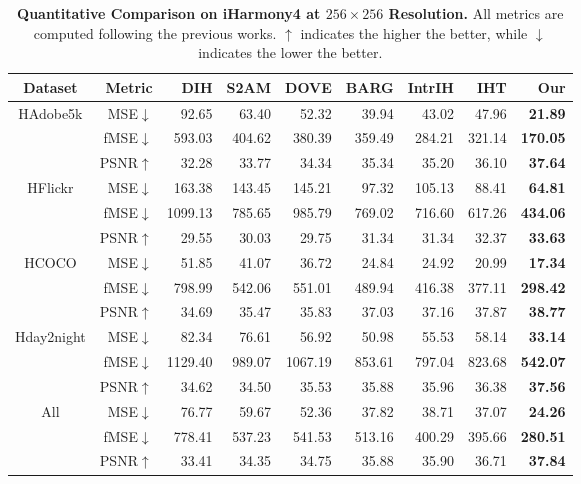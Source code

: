 \documentclass[runningheads]{llncs}
\begin{document}
\begin{table*}[t]
  \begin{center}
    \caption{\textbf{Quantitative Comparison on iHarmony4 at $256\times256$ Resolution.} All metrics are computed following the previous works. $\uparrow$ indicates the higher the better, while $\downarrow$ indicates the lower the better.}\label{tab:lowresolution}
\setlength{\tabcolsep}{3pt}
\scriptsize
\begin{tabular}{c|r|rrrrrr|r}
\toprule
Dataset & Metric & DIH\cite{DIH} & S2AM\cite{S2AM} & DOVE\cite{DoveNet} & BARG\cite{BargainNet} & IntrIH\cite{IntrinsicIH} & IHT\cite{TransformerIH} & \;\;\;\;\;\;\;\;Our \\
\midrule
\multirow{3}{*}{HAdobe5k}
& MSE$\downarrow$  &  92.65 &  63.40 &  52.32 &  39.94 &  43.02 &  47.96 &  \textbf{21.89} \\
& fMSE$\downarrow$ & 593.03 & 404.62 & 380.39 & 359.49 & 284.21 & 321.14 & \textbf{170.05} \\
& PSNR$\uparrow$   &  32.28 &  33.77 &  34.34 &  35.34 &  35.20 &  36.10 &  \textbf{37.64} \\
\midrule
\multirow{3}{*}{HFlickr}
& MSE$\downarrow$  & 163.38 & 143.45 & 145.21 &  97.32 & 105.13 &  88.41 &  \textbf{64.81} \\
& fMSE$\downarrow$ &1099.13 & 785.65 & 985.79 & 769.02 & 716.60 & 617.26 & \textbf{434.06} \\
& PSNR$\uparrow$   &  29.55 &  30.03 &  29.75 &  31.34 &  31.34 &  32.37 &  \textbf{33.63} \\
\midrule
\multirow{3}{*}{HCOCO}
& MSE$\downarrow$  &  51.85 &  41.07 &  36.72 &  24.84 &  24.92 &  20.99 &  \textbf{17.34} \\
& fMSE$\downarrow$ & 798.99 & 542.06 & 551.01 & 489.94 & 416.38 & 377.11 & \textbf{298.42} \\
& PSNR$\uparrow$   &  34.69 &  35.47 &  35.83 &  37.03 &  37.16 &  37.87 &  \textbf{38.77} \\
\midrule
\multirow{3}{*}{Hday2night}
& MSE$\downarrow$  &  82.34 &  76.61 &  56.92 &  50.98 &  55.53 &  58.14 &  \textbf{33.14} \\
& fMSE$\downarrow$ &1129.40 & 989.07 &1067.19 & 853.61 & 797.04 & 823.68 & \textbf{542.07} \\
& PSNR$\uparrow$   &  34.62 &  34.50 &  35.53 &  35.88 &  35.96 &  36.38 &  \textbf{37.56} \\
\midrule
\multirow{3}{*}{All}
& MSE$\downarrow$  &  76.77 &  59.67 &  52.36 &  37.82 &  38.71 &  37.07 &  \textbf{24.26} \\
& fMSE$\downarrow$ & 778.41 & 537.23 & 541.53 & 513.16 & 400.29 & 395.66 & \textbf{280.51} \\
& PSNR$\uparrow$   &  33.41 &  34.35 &  34.75 &  35.88 &  35.90 &  36.71 &  \textbf{37.84} \\
\bottomrule
\end{tabular}
\vspace{-0.5cm}
\end{center}
\end{table*}
\end{document}

